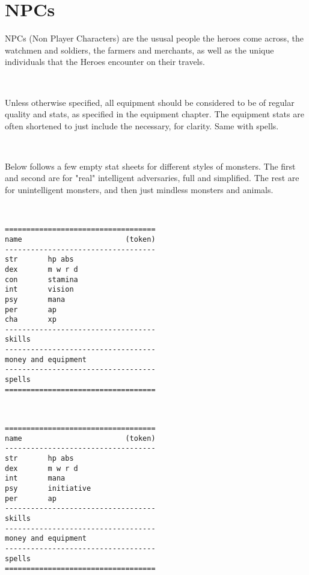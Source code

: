 

\raggedbottom






\chapter*{NPCs}

NPCs (Non Player Characters) are the ususal people the heroes come across, the watchmen and soldiers, the farmers and merchants, as well as the unique individuals that the Heroes encounter on their travels.

\

Unless otherwise specified, all equipment should be considered to be of regular quality and stats, as specified in the equipment chapter. The equipment stats are often shortened to just include the necessary, for clarity. Same with spells.

\

Below follows a few empty stat sheets for different styles of monsters. The first and second are for "real" intelligent adversaries, full and simplified. The rest are for unintelligent monsters, and then just mindless monsters and animals.

\

\goodbreak \begin{samepage} \small \begin{verbatim}
===================================
name                        (token)
-----------------------------------
str       hp abs
dex       m w r d
con       stamina
int       vision
psy       mana
per       ap
cha       xp
-----------------------------------
skills
-----------------------------------
money and equipment
-----------------------------------
spells
===================================
\end{verbatim} \normalsize \end{samepage}

\

\goodbreak \begin{samepage} \small \begin{verbatim}
===================================
name                        (token)
-----------------------------------
str       hp abs
dex       m w r d
int       mana
psy       initiative
per       ap
-----------------------------------
skills
-----------------------------------
money and equipment
-----------------------------------
spells
===================================
\end{verbatim} \normalsize \end{samepage}

